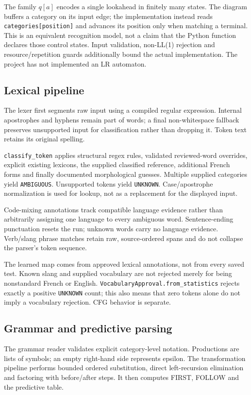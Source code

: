 \documentclass[11pt,a4paper]{article}
\begin{document}
The family \(q[a]\) encodes a single lookahead in finitely many states. The
diagram buffers a category on its input edge; the implementation instead
reads \nolinkurl{categories[position]} and advances its position only when
matching a terminal. This is an equivalent recognition model, not a claim
that the Python function declares those control states. Input validation,
non-LL(1) rejection and resource/repetition guards additionally bound the
actual implementation. The project has not implemented an LR automaton.

\subsection{Lexical pipeline}
The lexer first segments raw input using a compiled regular expression.
Internal apostrophes and hyphens remain part of words; a final non-whitespace
fallback preserves unsupported input for classification rather than dropping it.
Token text retains its original spelling.

\texttt{classify\_token} applies structural regex rules, validated reviewed-word
overrides, explicit existing lexicons, the supplied classified reference,
additional French forms and finally documented morphological guesses.
Multiple supplied categories yield \texttt{AMBIGUOUS}. Unsupported tokens yield
\texttt{UNKNOWN}. Case/apostrophe normalization is used for lookup, not as a
replacement for the displayed input.

Code-mixing annotations track compatible language evidence rather than
arbitrarily assigning one language to every ambiguous word. Sentence-ending
punctuation resets the run; unknown words carry no language evidence.
Verb/slang phrase matches retain raw, source-ordered spans and do not collapse
the parser's token sequence.

The learned map comes from approved lexical annotations, not from every saved
test. Known slang and supplied vocabulary are not rejected merely for being
nonstandard French or English. \texttt{VocabularyApproval.from\_statistics}
rejects exactly a positive \texttt{UNKNOWN} count; this also means that zero
tokens alone do not imply a vocabulary rejection. CFG behavior is separate.

\subsection{Grammar and predictive parsing}
The grammar reader validates explicit category-level notation. Productions are
lists of symbols; an empty right-hand side represents epsilon. The transformation
pipeline performs bounded ordered substitution, direct left-recursion elimination
and factoring with before/after steps. It then computes FIRST, FOLLOW and the
predictive table.
\end{document}
